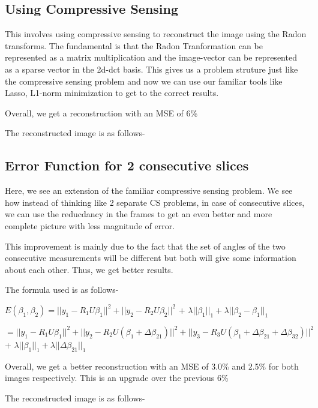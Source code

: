 \documentclass[a4paper,11pt]{article}
\numberwithin{definition}{section}
\numberwithin{mytheorem}{subsection}
\begin{document}
\subsection{Using Compressive Sensing}
This involves using compressive sensing to reconstruct the image using the Radon transforms. The fundamental is that the Radon Tranformation can be represented as a matrix multiplication and the image-vector can be represented as a sparse vector in the 2d-dct basis. This gives us a problem struture just like the compressive sensing problem and now we can use our familiar tools like Lasso, L1-norm minimization to get to the correct results.

Overall, we get a reconstruction with an MSE of 6\%

The reconstructed image is as follows-

\subsection{Error Function for 2 consecutive slices}

Here, we see an extension of the familiar compressive sensing problem. We see how instead of thinking like 2 separate CS problems, in case of consecutive slices, we can use the reducdancy in the frames to get an even better and more complete picture with less magnitude of error.

This improvement is mainly due to the fact that the set of angles of the two consecutive measurements will be different but both will give some information about each other. Thus, we get better results.

The formula used is as follows-

$E(\beta_1,\beta_2) =  ||y_1 - R_1U\beta_1||^2 + ||y_2 - R_2U\beta_2||^2$ + $\lambda||\beta_1||_1 + \lambda||\beta_2-\beta_1||_1$

$ = ||y_1 - R_1U\beta_1||^2 + ||y_2 - R_2U(\beta_1 + \Delta\beta_{21})||^2 + ||y_3 - R_3U(\beta_1 + \Delta\beta_{21} + \Delta\beta_{32})||^2$ + $\lambda||\beta_1||_1 + \lambda||\Delta\beta_{21}||_1$

Overall, we get a better reconstruction with an MSE of 3.0\% and 2.5\% for both images respectively. This is an upgrade over the previous 6\%

The reconstructed image is as follows-
\end{document}
